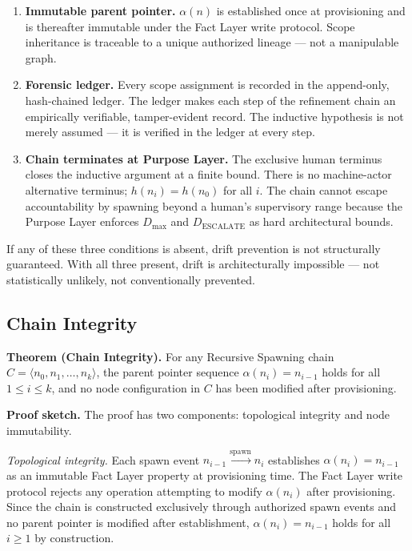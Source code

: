 \begin{enumerate}
    \item[(1)] \textbf{Immutable parent pointer.} $\alpha(n)$ is established once at provisioning and is thereafter immutable under the Fact Layer write protocol. Scope inheritance is traceable to a unique authorized lineage --- not a manipulable graph.
    \item[(2)] \textbf{Forensic ledger.} Every scope assignment is recorded in the append-only, hash-chained ledger. The ledger makes each step of the refinement chain an empirically verifiable, tamper-evident record. The inductive hypothesis is not merely assumed --- it is verified in the ledger at every step.
    \item[(3)] \textbf{Chain terminates at Purpose Layer.} The exclusive human terminus closes the inductive argument at a finite bound. There is no machine-actor alternative terminus; $h(n_i) = h(n_0)$ for all $i$. The chain cannot escape accountability by spawning beyond a human's supervisory range because the Purpose Layer enforces $D_{\mathrm{max}}$ and $D_{\mathrm{ESCALATE}}$ as hard architectural bounds.
\end{enumerate}

If any of these three conditions is absent, drift prevention is not structurally guaranteed. With all three present, drift is architecturally impossible --- not statistically unlikely, not conventionally prevented.

\subsection{Chain Integrity}
\label{sec:rs-chain-integrity}

\medskip
\noindent\textbf{Theorem (Chain Integrity).} For any Recursive Spawning chain $C = \langle n_0, n_1, \ldots, n_k \rangle$, the parent pointer sequence $\alpha(n_i) = n_{i-1}$ holds for all $1 \leq i \leq k$, and no node configuration in $C$ has been modified after provisioning.

\medskip
\noindent\textbf{Proof sketch.} The proof has two components: topological integrity and node immutability.

\medskip
\textit{Topological integrity.} Each spawn event $n_{i-1} \xrightarrow{\mathrm{spawn}} n_i$ establishes $\alpha(n_i) = n_{i-1}$ as an immutable Fact Layer property at provisioning time. The Fact Layer write protocol rejects any operation attempting to modify $\alpha(n_i)$ after provisioning. Since the chain is constructed exclusively through authorized spawn events and no parent pointer is modified after establishment, $\alpha(n_i) = n_{i-1}$ holds for all $i \geq 1$ by construction.

